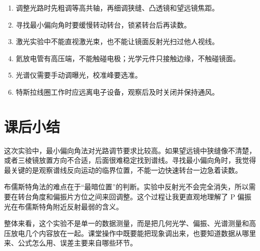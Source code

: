 \documentclass[UTF8,12pt,a4paper]{ctexart}
\begin{document}
\begin{enumerate}[label=\arabic*.,leftmargin=2.2em]
    \item 调整光路时先粗调等高共轴，再细调狭缝、凸透镜和望远镜焦距。
    \item 寻找最小偏向角时要缓慢转动转台，锁紧转台后再读数。
    \item 激光实验中不能直视激光束，也不能让镜面反射光扫过他人视线。
    \item 氦放电管有高压端，不能触碰电极；光学元件只接触边缘，不触碰镜面。
    \item 光谱仪需要手动调曝光，校准峰要选准。
    \item 特斯拉线圈工作时应远离电子设备，观察后及时关闭并保持通风。
\end{enumerate}

\section{课后小结}

这次实验中，最小偏向角法对光路调节要求比较高。如果望远镜中狭缝像不清楚，或者三棱镜放置方向不合适，后面很难稳定找到谱线。寻找最小偏向角时，我觉得最关键的是观察谱线反向运动的临界位置，不能一边快速转台一边急着读数。

布儒斯特角法的难点在于“最暗位置”的判断。实验中反射光不会完全消失，所以需要在转台角度和偏振片方位之间来回调整。这个过程让我更直观地理解了 P 偏振光在布儒斯特角附近反射最弱的含义。

整体来看，这个实验不是单一的数据测量，而是把几何光学、偏振、光谱测量和高压放电几个内容放在一起。课堂操作中既要能把现象调出来，也要知道数据从哪里来、公式怎么用、误差主要来自哪些环节。
\end{document}
